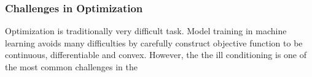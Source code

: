 \subsubsection{Challenges in Optimization}

Optimization is traditionally very difficult task. Model training in machine learning avoids many difficulties by carefully construct objective function to be continuous, differentiable and convex. However, the
the ill conditioning is one of the most common challenges in the 